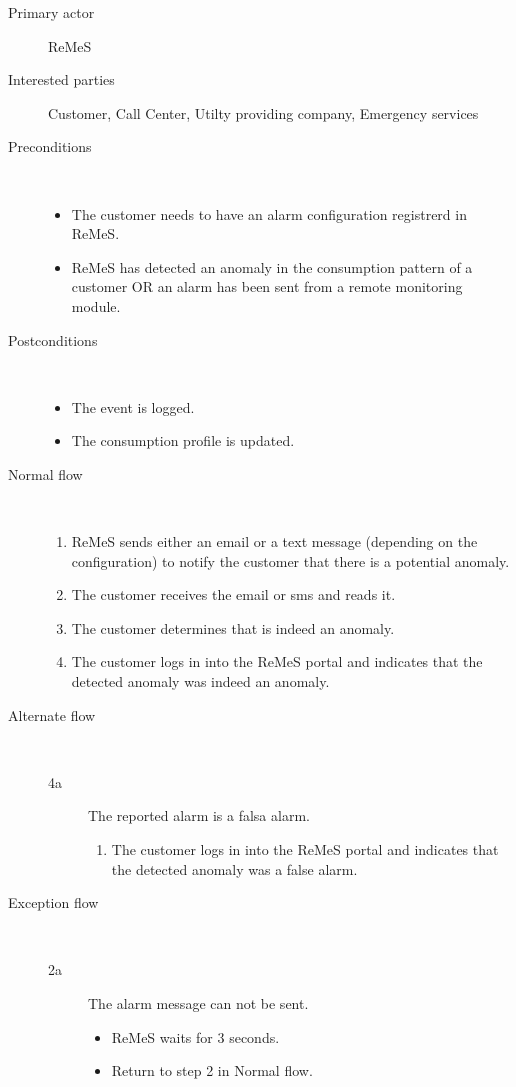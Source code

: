 \begin{description}
	\item[Primary actor] ReMeS
	\item[Interested parties] Customer, Call Center, Utilty providing company,
	Emergency services
	\item[Preconditions] \ 
	\begin{itemize}
		\item The customer needs to have an alarm configuration registrerd in ReMeS.
		\item ReMeS has detected an anomaly in the consumption pattern of a
		customer OR an alarm has been sent from a remote monitoring module.
	\end{itemize}
	\item[Postconditions] \ 
	\begin{itemize}
		\item The event is logged.
		\item The consumption profile is updated.
	\end{itemize}
	\item[Normal flow] \ 
	\begin{enumerate}
	  	\item ReMeS sends either an email or a text message (depending on
	  	the configuration) to notify the customer that there is a potential anomaly.
	  	\item The customer receives the email or sms and reads it.
	  	\item The customer determines that is indeed an anomaly.
	  	\item The customer logs in into the ReMeS portal and indicates that the detected anomaly was indeed an anomaly.
	\end{enumerate}
	\item[Alternate flow] \ 
	\begin{description}
		\item[4a] The reported alarm is a falsa alarm.
		\begin{enumerate}
		  \item The customer logs in into the ReMeS portal and indicates that the detected anomaly was a false alarm.
		\end{enumerate}
	\end{description}
	\item[Exception flow] \ 
	\begin{description}
		\item[2a] The alarm message can not be sent.
		\begin{itemize}
			\item ReMeS waits for 3 seconds.
			\item Return to step 2 in Normal flow. 
		\end{itemize}
	\end{description}
\end{description}